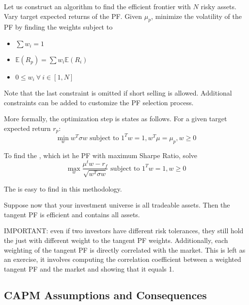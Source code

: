 \documentclass[12pt]{scrartcl}
\newcommand{\E}{\mathbb{E}}
\begin{document}
\begin{example}
  Let us construct an algorithm to find the efficient frontier with $N$ risky assets. 
  Vary target expected returns of the PF. Given $\mu_p$, minimize the 
  volatility of the PF by finding the weights subject to 
  \begin{itemize}
    \item $\sum w_i = 1$
    \item $\E(R_p) = \sum w_i \E(R_i)$
    \item $0 \leq w_i \ \forall \ i \in [1, N]$
  \end{itemize}
  Note that the last constraint is omitted if short selling is allowed. Additional 
  constraints can be added to customize the PF selection process. 

  More formally, the optimization step is states as follows. For a given target
  expected return $r_p$: 
  \[\min_{w} w^T \sigma w \text{ subject to } 1^T w = 1, w^T\mu = \mu_p, w \geq 0\]

  To find the , which ist he PF with maximum Sharpe Ratio, 
  solve 
  \[\max_w \dfrac{\mu^t w - r_f}{\sqrt{w^T \sigma w}} \text{ subject to } 1^Tw = 1, w \geq 0\]

  The  is easy to find in this methodology.
\end{example}

\begin{note}
  Suppose now that your investment universe is all tradeable assets. Then the 
  tangent PF is efficient and contains all assets. 
\end{note}

\begin{note}
  IMPORTANT: even if two investors have different risk tolerances, they still hold 
  the  just with different weight to the 
  tangent PF weights. Additionally, each weighting of the tangent PF 
  is directly correlated with the market. This is left as an exercise, it involves 
  computing the correlation coefficient between a weighted tangent PF and the market 
  and showing that it equals 1.
\end{note}

\subsection{CAPM Assumptions and Consequences}
\end{document}
